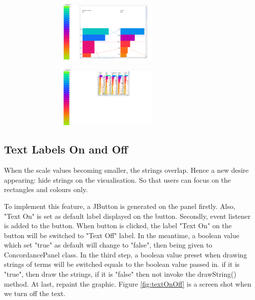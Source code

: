 	\begin{figure}[H]
	\centering	
	\includegraphics[width=9cm, height=3cm]{Figs/Zoom-In}\\[1ex]
	\caption{}
	\label{fig:zoomIn}
	\end{figure}

	\begin{figure}[H]
	\centering	
	\includegraphics[width=9cm, height=3cm]{Figs/Zoom-Out}\\[1ex]
	\caption{}
	\label{fig:zoomOut}
	\end{figure}

\subsection{Text Labels On and Off}

When the scale values becoming smaller, the strings overlap. Hence a new desire appearing: hide strings on the visualisation. So that users can focus on the rectangles and colours only. 

To implement this feature, a JButton is generated on the panel firstly. Also, "Text On" is set as default label displayed on the button. Secondly, event listener is added to the button. When button is clicked, the label "Text On" on the button will be switched to "Text Off" label. In the meantime, a boolean value which set "true" as default will change to "false", then being given to ConcordancePanel class. In the third step, a boolean value preset when drawing strings of terms will be switched equals to the boolean value passed in. if it is "true", then draw the strings, if it is "false" then not invoke the drawString() method. At last, repaint the graphic. Figure \ref{fig:textOnOff} is a screen shot when we turn off the text.

